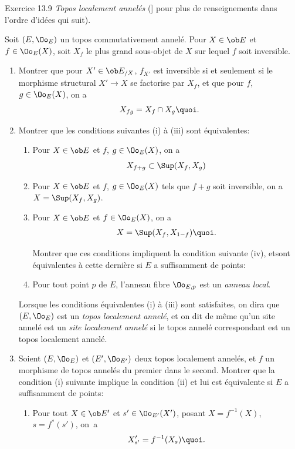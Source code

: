 \documentclass[10pt]{../fichiers-configuration-latex/smfart}
\begin{document}
\begin{enonce*}[remark]{Exercice 13.9}
\emph{Topos localement annelés} (\cf [\hyperref[IV.sec9]{9}] pour plus de
renseignements dans l'ordre d'idées qui suit).

Soit $(E,{\Oo}_E)$ un topos commutativement annelé. Pour $X\in
\ob E$ et $f\in {\Oo}_E(X)$, soit $X_f$ le plus grand sous-objet
de $X$ sur lequel $f$ soit inversible.
\begin{enumerate}
\renewcommand{\theenumi}{\alph{enumi}}
\renewcommand{\labelenumi}{\theenumi)}
\item Montrer que pour $X'\in \ob E_{/X}$, $f_{X'}$ est inversible si
et seulement si le morphisme structural $X'\rightarrow X$ se
factorise par $X_f$, et que pour $f$, $g\in {\Oo}_E(X)$, on a
$$
X_{fg}=X_f\cap X_g{\quoi}.
$$

\item Montrer que les conditions suivantes (i) à (iii) sont
équivalentes:
\begin{enumerate}
\renewcommand{\theenumii}{\roman{enumii}}
\renewcommand{\labelenumii}{(\theenumii)}
\item Pour $X\in \ob E$ et $f$, $g\in {\Oo}_E(X)$, on a
$$
X_{f+g}\subset \Sup(X_f,X_g)
$$

\item Pour $X\in \ob E$ et $f$, $g\in {\Oo}_E(X)$ tels que $f+g$ soit
inversible, on a $X=\Sup(X_f,X_g)$.

\item Pour $X\in \ob E$ et $f\in {\Oo}_E(X)$, on a
$$
X=\Sup(X_f, X_{1-f}){\quoi}.
$$

Montrer que ces conditions impliquent la condition suivante (iv),
et\pageoriginale sont équivalentes à cette dernière si $E$ a
suffisamment de points:

\item Pour tout point $p$ de $E$, l'anneau fibre ${\Oo}_{E,p}$ est un
\emph{anneau local}.
\end{enumerate}

Lorsque les conditions équivalentes (i) à (iii) sont satisfaites, on
dira que $(E,{\Oo}_E)$ est un \emph{topos localement annelé}, et
on dit de même qu'un site annelé est un \emph{site localement
annelé} si le topos annelé correspondant est un topos localement
annelé.

\item Soient $(E,{\Oo}_E)$ et $(E',{\Oo}_{E'})$ deux topos localement
annelés, et $f$ un morphisme de topos annelés du premier dans le
second. Montrer que la condition (i) suivante implique la condition
(ii) et lui est équivalente si $E$ a suffisamment de points:
\begin{enumerate}
\renewcommand{\theenumii}{\roman{enumii}}
\renewcommand{\labelenumii}{(\theenumii)}
\item Pour tout $X\in \ob E'$ et $s'\in {\Oo}_{E'}(X')$, posant
$X=f^{-1}(X)$, $s=f^{\ast}(s')$, on~a
$$
X'_{s'}=f^{-1}(X_s){\quoi}.
$$


\end{enumerate}
\end{enumerate}
\end{enonce*}
\end{document}
